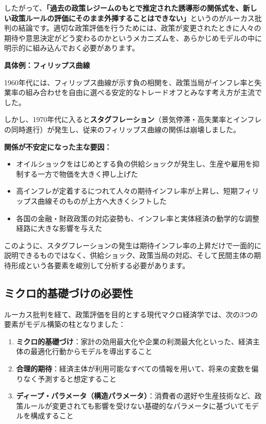 \documentclass[
  japanese,
  lualatex,
  ja=standard,
  12pt,
  a4paper]{ltjsarticle}
\providecommand{\tightlist}{%
  \setlength{\itemsep}{0pt}\setlength{\parskip}{0pt}}
\begin{document}
したがって、\textbf{「過去の政策レジームのもとで推定された誘導形の関係式を、新しい政策ルールの評価にそのまま外挿することはできない」}というのがルーカス批判の結論です。適切な政策評価を行うためには、政策が変更されたときに人々の期待や意思決定がどう変わるのかというメカニズムを、あらかじめモデルの中に明示的に組み込んでおく必要があります。


\textbf{具体例：フィリップス曲線}

1960年代には、フィリップス曲線が示す負の相関を、政策当局がインフレ率と失業率の組み合わせを自由に選べる安定的なトレードオフとみなす考え方が主流でした。

しかし、1970年代に入ると\textbf{スタグフレーション}（景気停滞・高失業率とインフレの同時進行）が発生し、従来のフィリップス曲線の関係は崩壊しました。


\textbf{関係が不安定になった主な要因：}

\begin{itemize}
\tightlist
\item
  オイルショックをはじめとする負の供給ショックが発生し、生産や雇用を抑制する一方で物価を大きく押し上げた
\item
  高インフレが定着するにつれて人々の期待インフレ率が上昇し、短期フィリップス曲線そのものが上方へ大きくシフトした
\item
  各国の金融・財政政策の対応姿勢も、インフレ率と実体経済の動学的な調整経路に大きな影響を与えた
\end{itemize}

このように、スタグフレーションの発生は期待インフレ率の上昇だけで一面的に説明できるものではなく、供給ショック、政策当局の対応、そして民間主体の期待形成という各要素を峻別して分析する必要があります。

\subsection{ミクロ的基礎づけの必要性}\label{ux30dfux30afux30edux7684ux57faux790eux3065ux3051ux306eux5fc5ux8981ux6027}

ルーカス批判を経て、政策評価を目的とする現代マクロ経済学では、次の3つの要素がモデル構築の柱となりました：

\begingroup
{}

\begin{enumerate}
\def\labelenumi{\arabic{enumi}.}
\tightlist
\item
  \textbf{ミクロ的基礎づけ}：家計の効用最大化や企業の利潤最大化といった、経済主体の最適化行動からモデルを導出すること
\item
  \textbf{合理的期待}：経済主体が利用可能なすべての情報を用いて、将来の変数を偏りなく予測すると想定すること
\item
  \textbf{ディープ・パラメータ（構造パラメータ）}：消費者の選好や生産技術など、政策ルールが変更されても影響を受けない基礎的なパラメータに基づいてモデルを構成すること
\end{enumerate}
\end{document}
